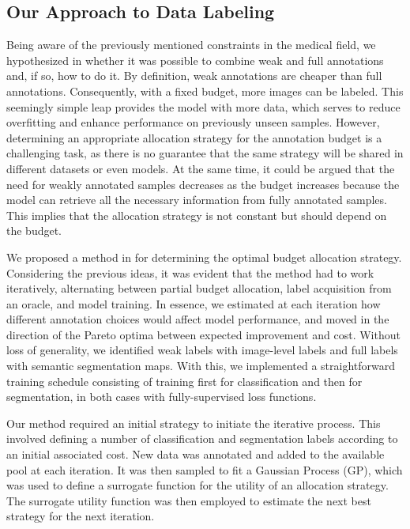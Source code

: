 \subsection{Our Approach to Data Labeling}
Being aware of the previously mentioned constraints in the medical field, we hypothesized in  whether it was possible to combine weak and full annotations and, if so, how to do it. By definition, weak annotations are cheaper than full annotations. Consequently, with a fixed budget, more images can be labeled. This seemingly simple leap provides the model with more data, which serves to reduce overfitting and enhance performance on previously unseen samples. However, determining an appropriate allocation strategy for the annotation budget is a challenging task, as there is no guarantee that the same strategy will be shared in different datasets or even models. At the same time, it could be argued that the need for weakly annotated samples decreases as the budget increases because the model can retrieve all the necessary information from fully annotated samples. This implies that the allocation strategy is not constant but should depend on the budget.

We proposed a method in  for determining the optimal budget allocation strategy. Considering the previous ideas, it was evident that the method had to work iteratively, alternating between partial budget allocation, label acquisition from an oracle, and model training. In essence, we estimated at each iteration how different annotation choices would affect model performance, and moved in the direction of the Pareto optima between expected improvement and cost. Without loss of generality, we identified weak labels with image-level labels and full labels with semantic segmentation maps. With this, we implemented a straightforward training schedule consisting of training first for classification and then for segmentation, in both cases with fully-supervised loss functions. 

Our method required an initial strategy to initiate the iterative process. This involved defining a number of classification and segmentation labels according to an initial associated cost. New data was annotated and added to the available pool at each iteration. It was then sampled to fit a Gaussian Process (GP), which was used to define a surrogate function for the utility of an allocation strategy. The surrogate utility function was then employed to estimate the next best strategy for the next iteration.

